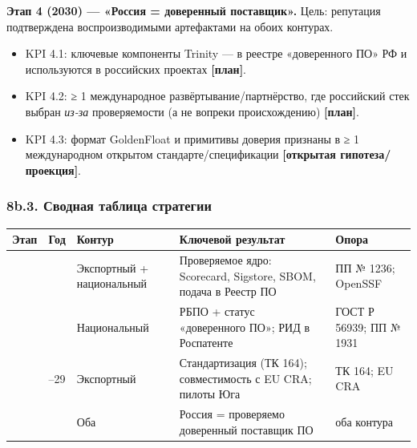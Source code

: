 \documentclass[
  russian,
]{article}
\providecommand{\tightlist}{%
  \setlength{\itemsep}{0pt}\setlength{\parskip}{0pt}}
\begin{document}
\textbf{Этап 4 (2030) --- «Россия = доверенный поставщик».} Цель:
репутация подтверждена воспроизводимыми артефактами на обоих контурах.

\begin{itemize}
\tightlist
\item
  KPI 4.1: ключевые компоненты Trinity --- в реестре «доверенного ПО» РФ
  и используются в российских проектах \textbf{{[}план{]}}.
\item
  KPI 4.2: ≥ 1 международное развёртывание/партнёрство, где российский
  стек выбран \emph{из-за} проверяемости (а не вопреки происхождению)
  \textbf{{[}план{]}}.
\item
  KPI 4.3: формат GoldenFloat и примитивы доверия признаны в ≥ 1
  международном открытом стандарте/спецификации \textbf{{[}открытая
  гипотеза/проекция{]}}.
\end{itemize}

\subsubsection{8b.3. Сводная таблица
стратегии}\label{b.3.-ux441ux432ux43eux434ux43dux430ux44f-ux442ux430ux431ux43bux438ux446ux430-ux441ux442ux440ux430ux442ux435ux433ux438ux438}

\begin{longtable}[]{@{}
  >{\raggedright\arraybackslash}p{}
  >{\raggedright\arraybackslash}p{}
  >{\raggedright\arraybackslash}p{}
  >{\raggedright\arraybackslash}p{}
  >{\raggedright\arraybackslash}p{}@{}}
\toprule\noalign{}
\begin{minipage}[b]{\linewidth}\raggedright
Этап
\end{minipage} & \begin{minipage}[b]{\linewidth}\raggedright
Год
\end{minipage} & \begin{minipage}[b]{\linewidth}\raggedright
Контур
\end{minipage} & \begin{minipage}[b]{\linewidth}\raggedright
Ключевой результат
\end{minipage} & \begin{minipage}[b]{\linewidth}\raggedright
Опора
\end{minipage} \\
\midrule\noalign{}
\endhead
\bottomrule\noalign{}
\endlastfoot
1 & 2026 & Экспортный + национальный & Проверяемое ядро: Scorecard,
Sigstore, SBOM, подача в Реестр ПО & ПП № 1236; OpenSSF \\
2 & 2027 & Национальный & РБПО + статус «доверенного ПО»; РИД в
Роспатенте & ГОСТ Р 56939; ПП № 1931 \\
3 & 2028--29 & Экспортный & Стандартизация (ТК 164); совместимость с EU
CRA; пилоты Юга & ТК 164; EU CRA \\
4 & 2030 & Оба & Россия = проверяемо доверенный поставщик ПО & оба
контура \\
\end{longtable}
\end{document}
